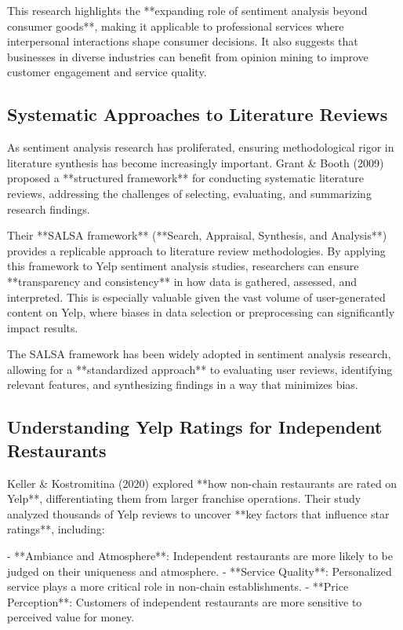 \documentclass{article}
\begin{document}
This research highlights the **expanding role of sentiment analysis beyond consumer goods**, making it applicable to professional services where interpersonal interactions shape consumer decisions. It also suggests that businesses in diverse industries can benefit from opinion mining to improve customer engagement and service quality.

\subsection{Systematic Approaches to Literature Reviews}

As sentiment analysis research has proliferated, ensuring methodological rigor in literature synthesis has become increasingly important. Grant \& Booth (2009)\cite{GrantBooth2009} proposed a **structured framework** for conducting systematic literature reviews, addressing the challenges of selecting, evaluating, and summarizing research findings.

Their **SALSA framework** (**Search, Appraisal, Synthesis, and Analysis**) provides a replicable approach to literature review methodologies. By applying this framework to Yelp sentiment analysis studies, researchers can ensure **transparency and consistency** in how data is gathered, assessed, and interpreted. This is especially valuable given the vast volume of user-generated content on Yelp, where biases in data selection or preprocessing can significantly impact results.

The SALSA framework has been widely adopted in sentiment analysis research, allowing for a **standardized approach** to evaluating user reviews, identifying relevant features, and synthesizing findings in a way that minimizes bias.

\subsection{Understanding Yelp Ratings for Independent Restaurants}

Keller \& Kostromitina (2020)\cite{KellerKostromitina2020} explored **how non-chain restaurants are rated on Yelp**, differentiating them from larger franchise operations. Their study analyzed thousands of Yelp reviews to uncover **key factors that influence star ratings**, including:

- **Ambiance and Atmosphere**: Independent restaurants are more likely to be judged on their uniqueness and atmosphere.
- **Service Quality**: Personalized service plays a more critical role in non-chain establishments.
- **Price Perception**: Customers of independent restaurants are more sensitive to perceived value for money.
\end{document}
